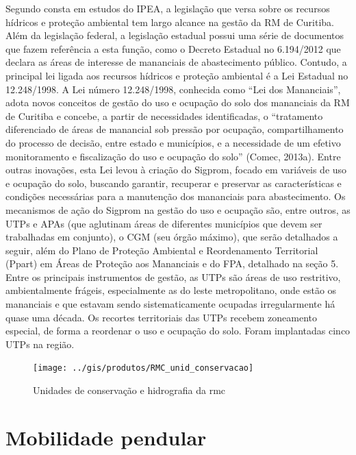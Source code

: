 	Segundo consta em estudos do IPEA, a legislação que versa sobre os recursos hídricos e proteção ambiental tem largo alcance na gestão da RM de Curitiba. Além da legislação federal, a legislação estadual possui uma série de documentos que fazem referência a esta função, como o Decreto Estadual no 6.194/2012 que declara as áreas de interesse de mananciais de abastecimento público. Contudo, a principal lei ligada aos recursos hídricos e proteção ambiental é a Lei Estadual no 12.248/1998. A Lei número 12.248/1998, conhecida como ``Lei dos Mananciais'', adota novos conceitos de gestão do uso e ocupação do solo dos mananciais da RM de Curitiba e concebe, a partir de necessidades identificadas, o ``tratamento diferenciado de áreas de manancial sob pressão por ocupação, compartilhamento do processo de decisão, entre estado e municípios, e a necessidade de um efetivo monitoramento e fiscalização do uso e ocupação do solo'' (Comec, 2013a). Entre outras inovações, esta Lei levou à criação do Sigprom, focado em variáveis de uso e ocupação do solo, buscando garantir, recuperar e preservar as características e condições necessárias para a manutenção dos mananciais para abastecimento. Os mecanismos de ação do Sigprom na gestão do uso e ocupação são, entre outros, as UTPs e APAs (que aglutinam áreas de diferentes municípios que devem ser trabalhadas em conjunto), o CGM (seu órgão máximo), que serão detalhados a seguir, além do Plano de Proteção Ambiental e Reordenamento Territorial (Ppart) em Áreas de Proteção aos Mananciais e do FPA, detalhado na seção 5. Entre os principais instrumentos de gestão, as UTPs são áreas de uso restritivo, ambientalmente frágeis, especialmente as do leste metropolitano, onde estão os mananciais e que estavam sendo sistematicamente ocupadas irregularmente há quase uma década. Os recortes territoriais das UTPs recebem zoneamento especial, de forma a reordenar o uso e ocupação do solo. Foram implantadas cinco UTPs na região.
	
	\begin{landscape}
		\begin{figure}
			\centering
			\caption{Unidades de conservação e hidrografia da \glsdesc{rmc}}
			\label{fig:rmcconservacao}
			\texttt{[image: ../gis/produtos/RMC\_unid\_conservacao]}
		\end{figure}
	\end{landscape}
	
	\section{Mobilidade pendular}
	
